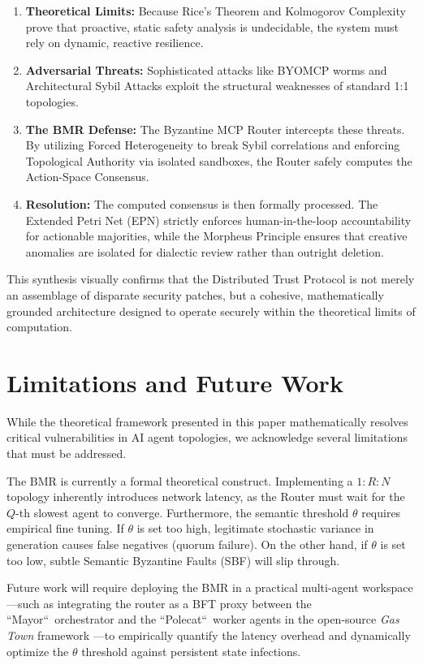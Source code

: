 \documentclass[a4paper,11pt,twocolumn]{article}
\theoremstyle{definition}
\theoremstyle{plain}
\begin{document}
\begin{enumerate}
    \item \textbf{Theoretical Limits:} Because Rice's Theorem and Kolmogorov Complexity prove that proactive, static safety analysis is undecidable, the system must rely on dynamic, reactive resilience.
    \item \textbf{Adversarial Threats:} Sophisticated attacks like BYOMCP worms and Architectural Sybil Attacks exploit the structural weaknesses of standard 1:1 topologies.
    \item \textbf{The BMR Defense:} The Byzantine MCP Router intercepts these threats. By utilizing Forced Heterogeneity to break Sybil correlations and enforcing Topological Authority via isolated sandboxes, the Router safely computes the Action-Space Consensus.
    \item \textbf{Resolution:} The computed consensus is then formally processed. The Extended Petri Net (EPN) strictly enforces human-in-the-loop accountability for actionable majorities, while the Morpheus Principle ensures that creative anomalies are isolated for dialectic review rather than outright deletion.
\end{enumerate}

This synthesis visually confirms that the Distributed Trust Protocol is not merely an assemblage of disparate security patches, but a cohesive, mathematically grounded architecture designed to operate securely within the theoretical limits of computation.

\section{Limitations and Future Work}

While the theoretical framework presented in this paper mathematically resolves critical vulnerabilities in AI agent topologies, we acknowledge several limitations that must be addressed.

The BMR is currently a formal theoretical construct. Implementing a $1:R:N$ topology inherently introduces network latency, as the Router must wait for the $Q$-th slowest agent to converge. Furthermore, the semantic threshold $\theta$ requires empirical fine tuning. If $\theta$ is set too high, legitimate stochastic variance in generation causes false negatives (quorum failure). On the other hand, if $\theta$ is set too low, subtle Semantic Byzantine Faults (SBF) will slip through.

Future work will require deploying the BMR in a practical multi-agent workspace---such as integrating the router as a BFT proxy between the “Mayor“\ orchestrator and the “Polecat“\ worker agents in the open-source \textit{Gas Town} framework \cite{yegge2026gastown}---to empirically quantify the latency overhead and dynamically optimize the $\theta$ threshold against persistent state infections.
\end{document}
